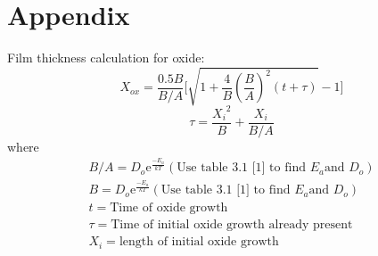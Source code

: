 \documentclass{article}
\newcommand{\me}{\mathrm{e}}
\begin{document}
\section{Appendix}
Film thickness calculation for oxide:
\begin{equation}
X_{ox} = \frac{0.5B}{B/A}\Big[\sqrt{1 + \frac{4}{B}(\frac{B}{A})^2(t + \tau)} - 1\Big]
\end{equation}
\begin{equation}
\tau = \frac{{X_i}^2}{B} + \frac{X_i}{B/A}
\end{equation}
where
\begin{align*}
B/A = D_o\me^{\frac{-E_a}{kT}} (\text{Use table 3.1 [1] to find }E_a \text{and } D_o) \\
B = D_o\me^{\frac{-E_a}{kT}} (\text{Use table 3.1 [1] to find }E_a \text{and } D_o) \\
t = \text{Time of oxide growth} \\ 
\tau = \text{Time of initial oxide growth already present} \\
X_i = \text{length of initial oxide growth}
\end{align*}









\end{document}
